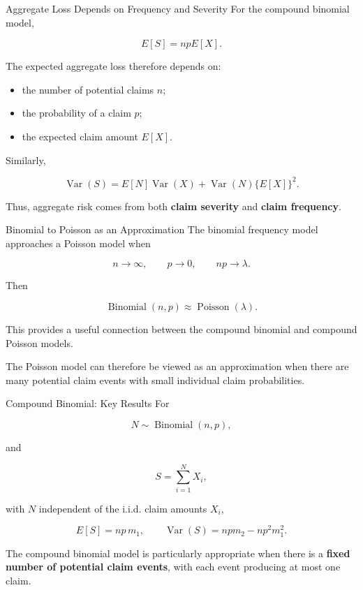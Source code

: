 \documentclass[
  ignorenonframetext,
  aspectratio=169,
]{beamer}
\providecommand{\tightlist}{%
  \setlength{\itemsep}{0pt}\setlength{\parskip}{0pt}}
\begin{document}
\begin{frame}{Aggregate Loss Depends on Frequency and Severity}
\protect{}\label{aggregate-loss-depends-on-frequency-and-severity}
For the compound binomial model,

\[
E[S]=npE[X].
\]

The expected aggregate loss therefore depends on:

\begin{itemize}
\tightlist
\item
  the number of potential claims \(n\);
\item
  the probability of a claim \(p\);
\item
  the expected claim amount \(E[X]\).
\end{itemize}

Similarly,

\[
\operatorname{Var}(S)
=
E[N]\operatorname{Var}(X)
+
\operatorname{Var}(N)\{E[X]\}^2.
\]

Thus, aggregate risk comes from both \textbf{claim severity} and
\textbf{claim frequency}.
\end{frame}

\begin{frame}{Binomial to Poisson as an Approximation}
\protect{}\label{binomial-to-poisson-as-an-approximation}
The binomial frequency model approaches a Poisson model when

\[
n\to\infty,
\qquad
p\to0,
\qquad
np\to\lambda.
\]

Then

\[
\operatorname{Binomial}(n,p)
\approx
\operatorname{Poisson}(\lambda).
\]

This provides a useful connection between the compound binomial and
compound Poisson models.

The Poisson model can therefore be viewed as an approximation when there
are many potential claim events with small individual claim
probabilities.
\end{frame}

\begin{frame}{Compound Binomial: Key Results}
\protect{}\label{compound-binomial-key-results}
For

\[
N\sim\operatorname{Binomial}(n,p),
\]

and

\[
S=\sum_{i=1}^{N}X_i,
\]

with \(N\) independent of the i.i.d. claim amounts \(X_i\),

\[
E[S]=np\,m_1,\qquad \operatorname{Var}(S)=npm_2-np^2m_1^2.
\]

The compound binomial model is particularly appropriate when there is a
\textbf{fixed number of potential claim events}, with each event
producing at most one claim.
\end{frame}
\end{document}
